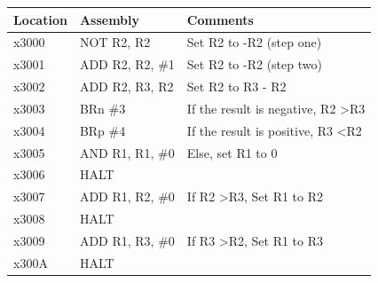 \documentclass{article}
\begin{document}
\begin{table}[!h]
\begin{tabular}{|l|l|l|}
\hline
\textbf{Location} & \textbf{Assembly} & \textbf{Comments}                             \\ \hline
x3000             & NOT R2, R2        & Set R2 to -R2 (step one)                      \\ \hline
x3001             & ADD R2, R2, \#1   & Set R2 to -R2 (step two)                      \\ \hline
x3002             & ADD R2, R3, R2    & Set R2 to R3 - R2                             \\ \hline
x3003             & BRn \#3           & If the result is negative, R2 \textgreater R3 \\ \hline
x3004             & BRp \#4           & If the result is positive, R3 \textless R2    \\ \hline
x3005             & AND R1, R1, \#0   & Else, set R1 to 0                             \\ \hline
x3006             & HALT              &                                               \\ \hline
x3007             & ADD R1, R2, \#0   & If R2 \textgreater R3, Set R1 to R2           \\ \hline
x3008             & HALT              &                                               \\ \hline
x3009             & ADD R1, R3, \#0   & If R3 \textgreater R2, Set R1 to R3           \\ \hline
x300A             & HALT              &                                               \\ \hline
\end{tabular}
\end{table}

\newpage
\end{document}
